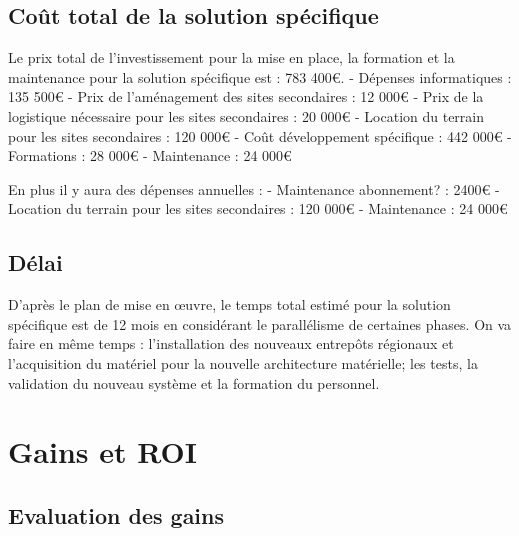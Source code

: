     \subsection{Coût total de la solution spécifique}

    Le prix total de l'investissement pour la mise en place, la formation et la maintenance pour la solution spécifique est : 783 400€.
          - Dépenses informatiques : 135 500€
          - Prix de l'aménagement des sites secondaires : 12 000€
          - Prix de la logistique nécessaire pour les sites secondaires : 20 000€
          - Location du terrain pour les sites secondaires : 120 000€
          - Coût développement spécifique : 442 000€
          - Formations : 28 000€
          - Maintenance : 24 000€

    En plus il y aura des dépenses annuelles :
          - Maintenance abonnement? : 2400€
          - Location du terrain pour les sites secondaires : 120 000€
          - Maintenance : 24 000€

        \subsection{Délai}

              D'après le plan de mise en œuvre, le temps total estimé pour la solution spécifique est de 12 mois en considérant le parallélisme de certaines phases. On va faire en même temps : l'installation des nouveaux entrepôts régionaux et l'acquisition du matériel pour la nouvelle architecture matérielle; les tests, la validation du nouveau système et la formation du personnel.


\section{Gains et ROI}
\subsection{Evaluation des gains}

